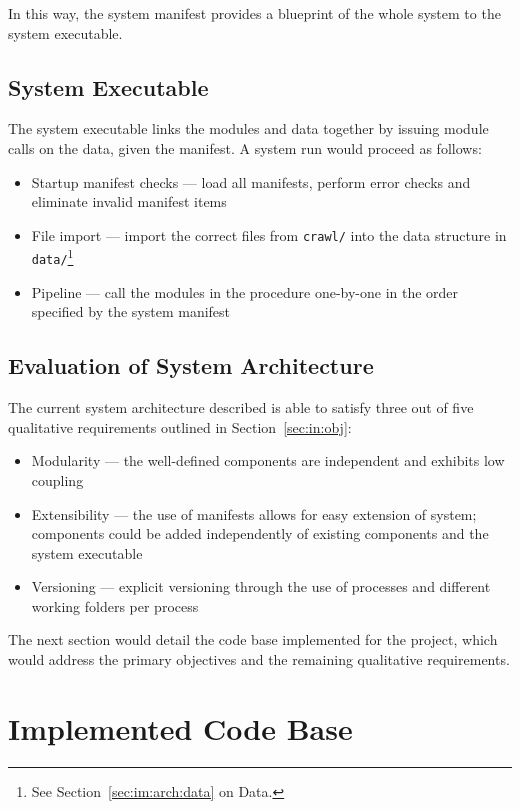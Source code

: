In this way, the system manifest provides a blueprint of the whole system
to the system executable.

\subsection{System Executable}\label{sec:im:arch:sys-exec}

The system executable links the modules and data together by issuing module
calls on the data, given the manifest. A system run would proceed as follows:

\begin{itemize}
    \item Startup manifest checks --- load all manifests, perform error
    checks and eliminate invalid manifest items
    \item File import --- import the correct files from \texttt{crawl/}
    into the data structure in
    \texttt{data/}\footnote{See Section~\ref{sec:im:arch:data} on Data.}
    \item Pipeline --- call the modules in the procedure one-by-one in
    the order specified by the system manifest
\end{itemize}

\subsection{Evaluation of System Architecture}

The current system architecture described is able to satisfy three out of
five qualitative requirements outlined in Section~\ref{sec:in:obj}:

\begin{itemize}
    \item Modularity --- the well-defined components are independent and
    exhibits low coupling
    \item Extensibility --- the use of manifests allows for easy extension
    of system; components could be added independently of existing
    components and the system executable
    \item Versioning --- explicit versioning through the use of processes
    and different working folders per process
\end{itemize}

The next section would detail the code base implemented for the project,
which would address the primary objectives and the remaining qualitative
requirements.

\section{Implemented Code Base}\label{sec:im:code}

